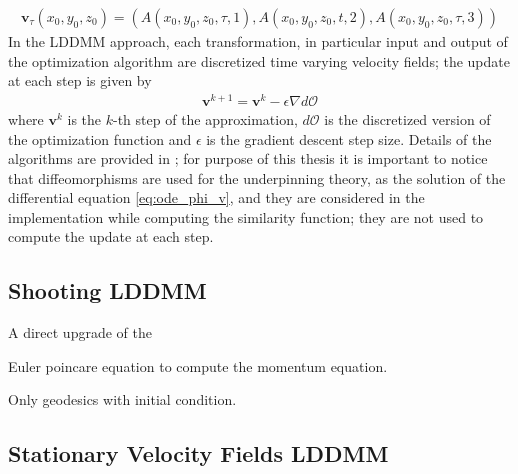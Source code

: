 \begin{align*}
\mathbf{v}_{\tau}(x_0,y_0,z_0) = (A(x_0,y_0,z_0,\tau,1), A(x_0,y_0,z_0,t,2), A(x_0,y_0,z_0,\tau,3))
\end{align*}
In the LDDMM approach, each transformation, in particular input and output of the optimization algorithm are discretized time varying velocity fields; the update at each step is given by
\begin{align*}
\mathbf{v}^{k+1} = \mathbf{v}^{k} - \epsilon \nabla d\mathcal{O}
\end{align*}
where $\mathbf{v}^{k}$ is the $k$-th step of the approximation, $d\mathcal{O}$ is the discretized version of the optimization function and $\epsilon$ is the gradient descent step size.
Details of the algorithms are provided in \cite{beg2005computing}; for purpose of this thesis it is important to notice that diffeomorphisms are used for the underpinning theory, as the solution of the differential equation \ref{eq:ode_phi_v}, and they are considered in the implementation while computing the similarity function; they are not used to compute the update at each step.

\subsection{Shooting LDDMM}

A direct upgrade of the 

Euler poincare equation to compute the momentum equation.


Only geodesics with initial condition.


\cite{vialard2012diffeomorphic}




\subsection{Stationary Velocity Fields LDDMM}



